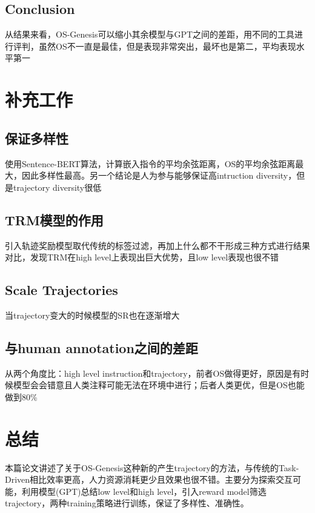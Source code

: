\documentclass[a4paper,12pt]{article}
\begin{document}
\subsection{Conclusion}
从结果来看，OS-Genesis可以缩小其余模型与GPT之间的差距，用不同的工具进行评判，虽然OS不一直是最佳，但是表现非常突出，最坏也是第二，平均表现水平第一

\section{补充工作}
\subsection{保证多样性}
使用Sentence-BERT算法，计算嵌入指令的平均余弦距离，OS的平均余弦距离最大，因此多样性最高。另一个结论是人为参与能够保证高intruction diversity，但是trajectory diversity很低

\subsection{TRM模型的作用}
引入轨迹奖励模型取代传统的标签过滤，再加上什么都不干形成三种方式进行结果对比，发现TRM在high level上表现出巨大优势，且low level表现也很不错

\subsection{Scale Trajectories}
当trajectory变大的时候模型的SR也在逐渐增大

\subsection{与human annotation之间的差距}
从两个角度比：high level instruction和trajectory，前者OS做得更好，原因是有时候模型会会错意且人类注释可能无法在环境中进行；后者人类更优，但是OS也能做到80\%

\section{总结}
本篇论文讲述了关于OS-Genesis这种新的产生trajectory的方法，与传统的Task-Driven相比效率更高，人力资源消耗更少且效果也很不错。主要分为探索交互可能，利用模型(GPT)总结low level和high level，引入reward model筛选trajectory，两种training策略进行训练，保证了多样性、准确性。
\end{document}
